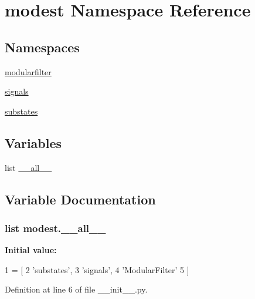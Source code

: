 \hypertarget{namespacemodest}{}\section{modest Namespace Reference}
\label{namespacemodest}
\subsection*{Namespaces}
\begin{DoxyCompactItemize}
\item 
 \hyperlink{namespacemodest_1_1modularfilter}{modularfilter}
\item 
 \hyperlink{namespacemodest_1_1signals}{signals}
\item 
 \hyperlink{namespacemodest_1_1substates}{substates}
\end{DoxyCompactItemize}
\subsection*{Variables}
\begin{DoxyCompactItemize}
\item 
list \hyperlink{namespacemodest_a8c36cd07da61d6f2919f708a59f575a7}{\+\_\+\+\_\+all\+\_\+\+\_\+}
\end{DoxyCompactItemize}


\subsection{Variable Documentation}
\subsubsection[{\texorpdfstring{\+\_\+\+\_\+all\+\_\+\+\_\+}{__all__}}]{\setlength{\rightskip}{0pt plus 5cm}list modest.\+\_\+\+\_\+all\+\_\+\+\_\+\hspace{0.3cm}{\ttfamily [private]}}\hypertarget{namespacemodest_a8c36cd07da61d6f2919f708a59f575a7}{}\label{namespacemodest_a8c36cd07da61d6f2919f708a59f575a7}
{\bfseries Initial value\+:}
\begin{DoxyCode}
1 = [
2     \textcolor{stringliteral}{'substates'},
3     \textcolor{stringliteral}{'signals'},
4     \textcolor{stringliteral}{'ModularFilter'}
5 ]
\end{DoxyCode}


Definition at line 6 of file \+\_\+\+\_\+init\+\_\+\+\_\+.\+py.

